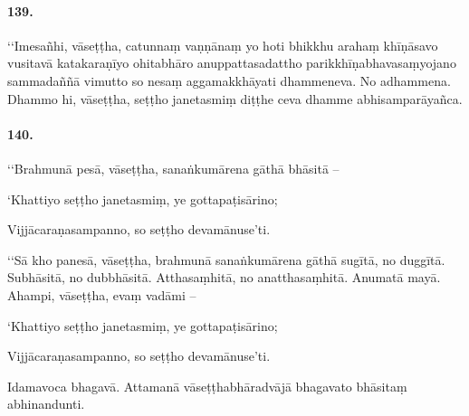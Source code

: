 \paragraph{139.} ‘‘Imesañhi, vāseṭṭha, catunnaṃ vaṇṇānaṃ yo hoti bhikkhu arahaṃ khīṇāsavo vusitavā katakaraṇīyo ohitabhāro anuppattasadattho parikkhīṇabhavasaṃyojano sammadaññā vimutto so nesaṃ aggamakkhāyati dhammeneva. No adhammena. Dhammo hi, vāseṭṭha, seṭṭho janetasmiṃ diṭṭhe ceva dhamme abhisamparāyañca.

\paragraph{140.} ‘‘Brahmunā pesā, vāseṭṭha, sanaṅkumārena gāthā bhāsitā –

‘Khattiyo seṭṭho janetasmiṃ, ye gottapaṭisārino;

Vijjācaraṇasampanno, so seṭṭho devamānuse’ti.

‘‘Sā kho panesā, vāseṭṭha, brahmunā sanaṅkumārena gāthā sugītā, no duggītā. Subhāsitā, no dubbhāsitā. Atthasaṃhitā, no anatthasaṃhitā. Anumatā mayā. Ahampi, vāseṭṭha, evaṃ vadāmi –

‘Khattiyo seṭṭho janetasmiṃ, ye gottapaṭisārino;

Vijjācaraṇasampanno, so seṭṭho devamānuse’ti.

Idamavoca bhagavā. Attamanā vāseṭṭhabhāradvājā bhagavato bhāsitaṃ abhinandunti.

